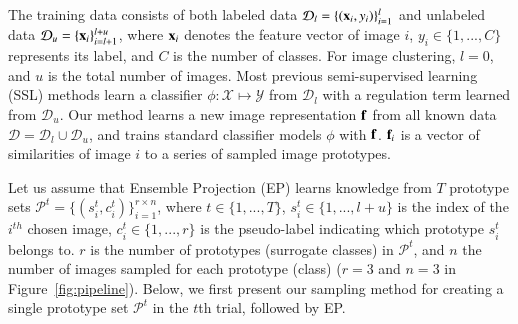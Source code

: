 \documentclass[preprint,12pt,3p]{elsarticle}
\begin{document}

The training data consists of both labeled data $\mathcal{D}_l =
\{(\bold{x}_i, y_i)\}_{i=1}^{l}$ and unlabeled data $\mathcal{D}_u =
\{\bold{x}_i\}_{i=l+1}^{l+u}$, where $\bold{x}_i$ denotes the feature
vector of image $i$, $y_i \in\{1, ..., C\}$ represents its label, and
$C$ is the number of classes. For image clustering, $l=0$, and
$u$ is the total number of images.  Most previous semi-supervised
learning (SSL) methods learn a classifier $\phi: \mathcal{X} \mapsto
\mathcal{Y}$ from $\mathcal{D}_l$ with a regulation term learned from
$\mathcal{D}_u$. Our method learns a new image representation
$\bold{f}$ from all known data $\mathcal{D} = \mathcal{D}_l \cup
\mathcal{D}_u$, and trains standard classifier models $\phi$ with
$\bold{f}$.  $\bold{f}_i$ is a vector of similarities of image $i$ to
a series of sampled image prototypes.

Let us assume that Ensemble Projection (EP) learns knowledge from $T$
prototype sets $\mathcal{P}^{t} = \{(s_i^t,
c_i^t)\}_{i=1}^{r\times n}$, where  $t\in \{1, ..., T \}$, $s_i^t \in \{1, ..., l+u \}$ is the index
of the $i^{th}$ chosen image, $c_i^t \in \{1, ..., r\}$ is the
pseudo-label indicating which prototype $s_i^t$ belongs to.  $r$ is the
number of prototypes (surrogate classes) in
$\mathcal{P}^t$, and $n$ the number of images sampled for each
prototype (class) (\eg $r=3$ and $n=3$ in Figure~\ref{fig:pipeline}).
Below, we first present our sampling method for creating a single
prototype set $\mathcal{P}^t$ in the $t$th trial, followed by EP.
\end{document}
